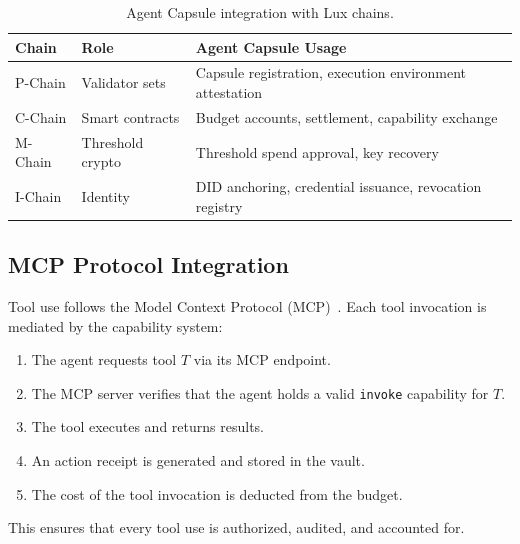 \begin{table}[H]
\centering
\caption{Agent Capsule integration with Lux chains.}
\label{tab:chains}
\begin{tabular}{llp{6.5cm}}
\toprule
\textbf{Chain} & \textbf{Role} & \textbf{Agent Capsule Usage} \\
\midrule
P-Chain & Validator sets & Capsule registration, execution environment attestation \\
C-Chain & Smart contracts & Budget accounts, settlement, capability exchange \\
M-Chain & Threshold crypto & Threshold spend approval, key recovery \\
I-Chain & Identity & DID anchoring, credential issuance, revocation registry \\
\bottomrule
\end{tabular}
\end{table}

\subsection{MCP Protocol Integration}

Tool use follows the Model Context Protocol (MCP)~\cite{anthropic2024mcp}. Each tool invocation is mediated by the capability system:

\begin{enumerate}
    \item The agent requests tool $T$ via its MCP endpoint.
    \item The MCP server verifies that the agent holds a valid \texttt{invoke} capability for $T$.
    \item The tool executes and returns results.
    \item An action receipt is generated and stored in the vault.
    \item The cost of the tool invocation is deducted from the budget.
\end{enumerate}

This ensures that every tool use is authorized, audited, and accounted for.

